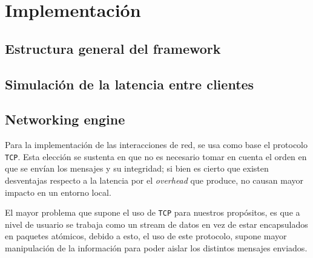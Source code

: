 \section{Implementación}


\subsection{Estructura general del framework}

% 

\subsection{Simulación de la latencia entre clientes}







\subsection{Networking engine}
Para la implementación de las interacciones de red, se usa como base el protocolo \texttt{TCP}. Esta elección se sustenta en que no es necesario tomar en cuenta el orden en que se envían los mensajes y su integridad; si bien es cierto que existen desventajas respecto a la latencia por el \emph{overhead} que produce, no causan mayor impacto en un entorno local.

El mayor problema que supone el uso de \texttt{TCP} para nuestros propósitos, es que a nivel de usuario se trabaja como un stream de datos en vez de estar encapsulados en paquetes atómicos, debido a esto, el uso de este protocolo, supone mayor manipulación de la información para poder aislar los distintos mensajes enviados.

